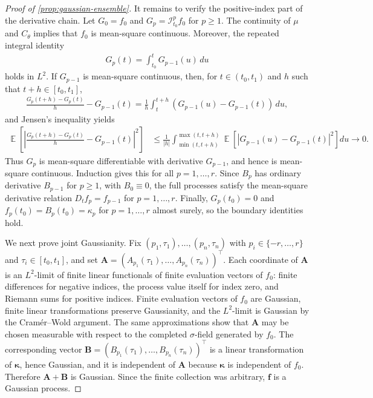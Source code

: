 \documentclass[11pt,a4paper]{article}
\theoremstyle{definition}
\theoremstyle{remark}
\DeclareMathOperator{\E}{\mathbb{E}}
\begin{document}
\begin{proof}[Proof of \cref{prop:gaussian-ensemble}]
It remains to verify the positive-index part of the derivative chain. Let \(G_0=f_0\) and \(G_p=\mathcal I_{t_0}^p f_0\) for \(p\ge1\). The continuity of \(\mu\) and \(C_\theta\) implies that \(f_0\) is mean-square continuous. Moreover, the repeated integral identity
\begin{align*}
G_p(t)=\int_{t_0}^t G_{p-1}(u)\,du
\end{align*}
holds in \(L^2\). If \(G_{p-1}\) is mean-square continuous, then, for \(t\in(t_0,t_1)\) and \(h\) such that \(t+h\in[t_0,t_1]\),
\begin{align*}
\frac{G_p(t+h)-G_p(t)}{h}-G_{p-1}(t)
=\frac{1}{h}\int_t^{t+h}\left(G_{p-1}(u)-G_{p-1}(t)\right)\,du,
\end{align*}
and Jensen's inequality yields
\begin{align*}
\E\!\left[\left|\frac{G_p(t+h)-G_p(t)}{h}-G_{p-1}(t)\right|^2\right]
&\le
\frac{1}{|h|}\int_{\min(t,t+h)}^{\max(t,t+h)}
\E\!\left[|G_{p-1}(u)-G_{p-1}(t)|^2\right]du
\to0.
\end{align*}
Thus \(G_p\) is mean-square differentiable with derivative \(G_{p-1}\), and hence is mean-square continuous. Induction gives this for all \(p=1,\ldots,r\). Since \(B_p\) has ordinary derivative \(B_{p-1}\) for \(p\ge1\), with \(B_0\equiv0\), the full processes satisfy the mean-square derivative relation \(D_t f_p=f_{p-1}\) for \(p=1,\ldots,r\). Finally, \(G_p(t_0)=0\) and $f_p(t_0)=B_p(t_0)=\kappa_p$ for $p=1,\ldots,r$ almost surely, so the boundary identities hold.

We next prove joint Gaussianity. Fix \((p_1,\tau_1),\ldots,(p_n,\tau_n)\) with \(p_i\in\{-r,\ldots,r\}\) and \(\tau_i\in[t_0,t_1]\), and set \(\mathbf A=(A_{p_1}(\tau_1),\ldots,A_{p_n}(\tau_n))^\top\). Each coordinate of \(\mathbf A\) is an \(L^2\)-limit of finite linear functionals of finite evaluation vectors of \(f_0\): finite differences for negative indices, the process value itself for index zero, and Riemann sums for positive indices. Finite evaluation vectors of \(f_0\) are Gaussian, finite linear transformations preserve Gaussianity, and the \(L^2\)-limit is Gaussian by the Cram\'er--Wold argument. The same approximations show that \(\mathbf A\) may be chosen measurable with respect to the completed \(\sigma\)-field generated by \(f_0\). The corresponding vector \(\mathbf B=(B_{p_1}(\tau_1),\ldots,B_{p_n}(\tau_n))^\top\) is a linear transformation of \(\boldsymbol\kappa\), hence Gaussian, and it is independent of \(\mathbf A\) because \(\boldsymbol\kappa\) is independent of \(f_0\). Therefore \(\mathbf A+\mathbf B\) is Gaussian. Since the finite collection was arbitrary, \(\mathbf f\) is a Gaussian process.


\end{proof}
\end{document}
